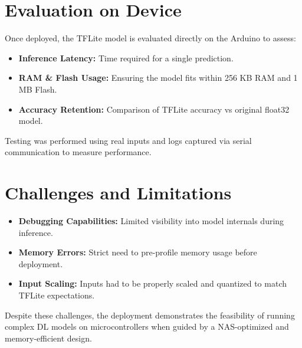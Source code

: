 \section{Evaluation on Device}

Once deployed, the TFLite model is evaluated directly on the Arduino to assess:

\begin{itemize}
\item \textbf{Inference Latency:} Time required for a single prediction.
\item \textbf{RAM \& Flash Usage:} Ensuring the model fits within 256 KB RAM and 1 MB Flash.
\item \textbf{Accuracy Retention:} Comparison of TFLite accuracy vs original float32 model.
\end{itemize}

Testing was performed using real inputs and logs captured via serial communication to measure performance.

\section{Challenges and Limitations}

\begin{itemize}
\item \textbf{Debugging Capabilities:} Limited visibility into model internals during inference.
\item \textbf{Memory Errors:} Strict need to pre-profile memory usage before deployment.
\item \textbf{Input Scaling:} Inputs had to be properly scaled and quantized to match TFLite expectations.
\end{itemize}

Despite these challenges, the deployment demonstrates the feasibility of running complex DL models on microcontrollers when guided by a NAS-optimized and memory-efficient design.